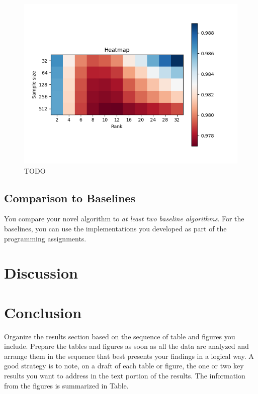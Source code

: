 \documentclass[10pt,conference,compsocconf]{IEEEtran}
\begin{document}
    \begin{figure}
        \includegraphics[width=\columnwidth]{figures/heatmap.png}
        \caption{TODO}
        \label{fig:Heatmap}
    \end{figure}


    \subsection{Comparison to Baselines}

    You compare your novel algorithm to \emph{at least two baseline
    algorithms}. For the baselines, you can use the implementations you
    developed as part of the programming assignments.


    \section{Discussion}


    \section{Conclusion}

    Organize the results section based on the sequence of table and
    figures you include. Prepare the tables and figures as soon as all
    the data are analyzed and arrange them in the sequence that best
    presents your findings in a logical way. A good strategy is to note,
    on a draft of each table or figure, the one or two key results you
    want to address in the text portion of the results.
    The information from the figures is
    summarized in Table.




    \balance
    
    
\end{document}
